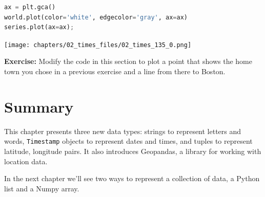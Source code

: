 \begin{lstlisting}[language=Python,style=source]
ax = plt.gca()
world.plot(color='white', edgecolor='gray', ax=ax)
series.plot(ax=ax);
\end{lstlisting}

\begin{center}
\texttt{[image: chapters/02\_times\_files/02\_times\_135\_0.png]}
\end{center}

\textbf{Exercise:} Modify the code in this section to plot a point that
shows the home town you chose in a previous exercise and a line from
there to Boston.

\hypertarget{summary}{%
\section{Summary}\label{summary}}

This chapter presents three new data types: strings to represent letters
and words, \passthrough{\lstinline!Timestamp!} objects to represent
dates and times, and tuples to represent latitude, longitude pairs. It
also introduces Geopandas, a library for working with location data.

In the next chapter we'll see two ways to represent a collection of
data, a Python list and a Numpy array.

